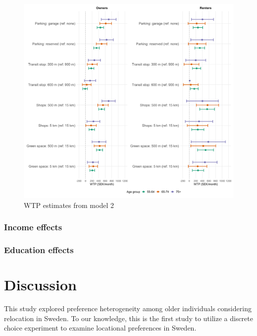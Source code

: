 \documentclass[3p,11pt ]{elsarticle}
\begin{document}


\begin{figure}[H]
\centering
\includegraphics[scale=0.30]{figures/wtp_age_interactions_own_rent_publication.png}
\caption{WTP estimates from model 2 \label{fig:wtp}}
\end{figure}





\subsubsection{Income effects}

\subsubsection{Education effects}




\section{Discussion}

This study explored preference heterogeneity among older individuals considering relocation in Sweden.
To our knowledge, 
this is the first study to utilize a discrete choice experiment to examine locational preferences in Sweden.
\end{document}
